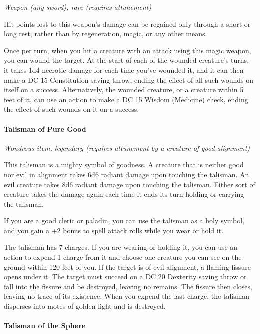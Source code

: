 \documentclass[
]{article}
\begin{document}
\emph{Weapon (any sword), rare (requires attunement)}

Hit points lost to this weapon's damage can be regained only through a
short or long rest, rather than by regeneration, magic, or any other
means.

Once per turn, when you hit a creature with an attack using this magic
weapon, you can wound the target. At the start of each of the wounded
creature's turns, it takes 1d4 necrotic damage for each time you've
wounded it, and it can then make a DC 15 Constitution saving throw,
ending the effect of all such wounds on itself on a success.
Alternatively, the wounded creature, or a creature within 5 feet of it,
can use an action to make a DC 15 Wisdom (Medicine) check, ending the
effect of such wounds on it on a success.

\hypertarget{talisman-of-pure-good}{%
\paragraph{Talisman of Pure Good}\label{talisman-of-pure-good}}

\emph{Wondrous item, legendary (requires attunement by a creature of
good alignment)}

This talisman is a mighty symbol of goodness. A creature that is neither
good nor evil in alignment takes 6d6 radiant damage upon touching the
talisman. An evil creature takes 8d6 radiant damage upon touching the
talisman. Either sort of creature takes the damage again each time it
ends its turn holding or carrying the talisman.

If you are a good cleric or paladin, you can use the talisman as a holy
symbol, and you gain a +2 bonus to spell attack rolls while you wear or
hold it.

The talisman has 7 charges. If you are wearing or holding it, you can
use an action to expend 1 charge from it and choose one creature you can
see on the ground within 120 feet of you. If the target is of evil
alignment, a flaming fissure opens under it. The target must succeed on
a DC 20 Dexterity saving throw or fall into the fissure and be
destroyed, leaving no remains. The fissure then closes, leaving no trace
of its existence. When you expend the last charge, the talisman
disperses into motes of golden light and is destroyed.

\hypertarget{talisman-of-the-sphere}{%
\paragraph{Talisman of the Sphere}\label{talisman-of-the-sphere}}
\end{document}
